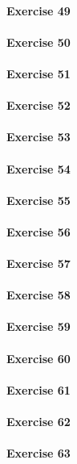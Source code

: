 \paragraph{Exercise 49}
\paragraph{Exercise 50}
\paragraph{Exercise 51}
\paragraph{Exercise 52}
\paragraph{Exercise 53}
\paragraph{Exercise 54}
\paragraph{Exercise 55}
\paragraph{Exercise 56}
\paragraph{Exercise 57}
\paragraph{Exercise 58}
\paragraph{Exercise 59}
\paragraph{Exercise 60}
\paragraph{Exercise 61}
\paragraph{Exercise 62}
\paragraph{Exercise 63}
